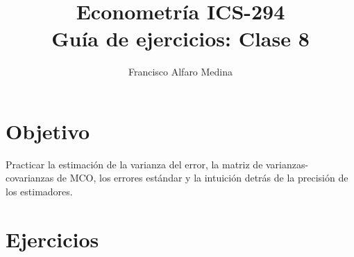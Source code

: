 \documentclass[11pt]{article}
\title{Econometría ICS-294\\Guía de ejercicios: Clase 8}
\author{Francisco Alfaro Medina}
\date{}
\begin{document}
\maketitle

\section*{Objetivo}

Practicar la estimación de la varianza del error, la matriz de varianzas-covarianzas de MCO, los errores estándar y la intuición detrás de la precisión de los estimadores.

\section*{Ejercicios}
\end{document}
